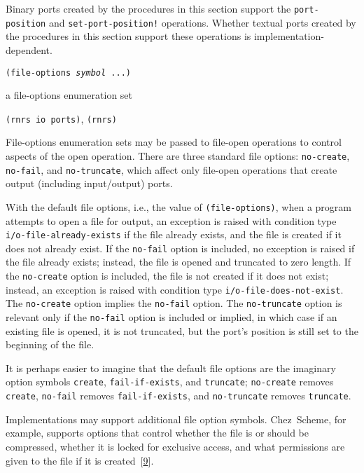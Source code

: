 Binary ports created by the procedures in this section support
the \texttt{port-position} and \texttt{set-port-position!} operations.
Whether textual ports created by the procedures in this section support
these operations is implementation-dependent.


\begin{description}

\label{io_s26}\item[syntax] \texttt{(file-options \textit{symbol} ...)}



\item[returns] a file-options enumeration set


\item[libraries] \texttt{(rnrs io ports)}, \texttt{(rnrs)}
\end{description}


File-options enumeration sets may be passed to file-open operations to
control aspects of the open operation.
There are three standard file options: \texttt{no-create}, \texttt{no-fail},
and \texttt{no-truncate}, which affect only file-open operations that
create output (including input/output) ports.


With the default file options, i.e., the value of \texttt{(file-options)},
when a program attempts to open a file for output, an exception is raised with
condition type \texttt{i/o-file-already-exists} if the file already exists,
and the file is created if it does not already exist.
If the \texttt{no-fail} option is included, no exception is raised if the
file already exists; instead, the file is opened and truncated to zero
length.
If the \texttt{no-create} option is included, the file is not created if
it does not exist; instead, an exception is raised with condition type
\texttt{i/o-file-does-not-exist}.
The \texttt{no-create} option implies the \texttt{no-fail} option.
The \texttt{no-truncate} option is relevant only if the \texttt{no-fail}
option is included or implied, in which case if an existing file is
opened, it is not truncated, but the port's position is still set to the
beginning of the file.


It is perhaps easier to imagine that the default file options are the
imaginary option symbols \texttt{create}, \texttt{fail-if-exists}, and
\texttt{truncate}; \texttt{no-create} removes
\texttt{create}, \texttt{no-fail} removes \texttt{fail-if-exists}, and
\texttt{no-truncate} removes \texttt{truncate}.


Implementations may support additional file option symbols.
Chez Scheme, for example, supports options that control whether the file
is or should be compressed, whether it is locked for exclusive access, and
what permissions are given to the file if it is created [\hyperref[bibliography_g227]{9}].


